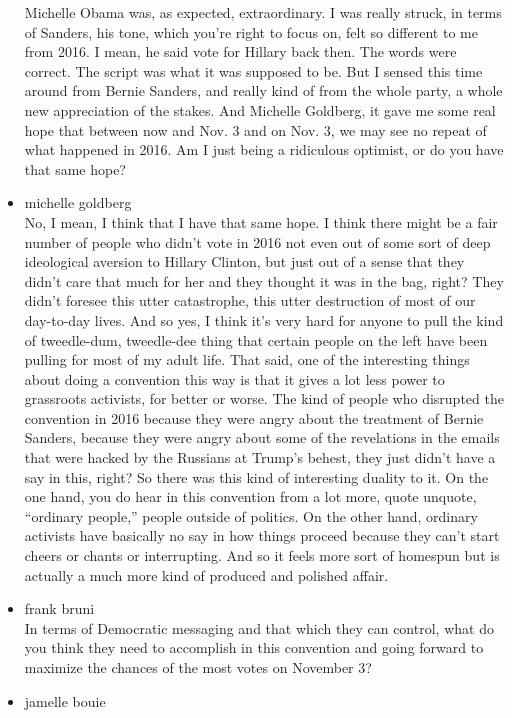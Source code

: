 \begin{itemize}
  Michelle Obama was, as expected, extraordinary. I was really struck,
  in terms of Sanders, his tone, which you're right to focus on, felt so
  different to me from 2016. I mean, he said vote for Hillary back then.
  The words were correct. The script was what it was supposed to be. But
  I sensed this time around from Bernie Sanders, and really kind of from
  the whole party, a whole new appreciation of the stakes. And Michelle
  Goldberg, it gave me some real hope that between now and Nov. 3 and on
  Nov. 3, we may see no repeat of what happened in 2016. Am I just being
  a ridiculous optimist, or do you have that same hope?
\item
  michelle goldberg\\
  No, I mean, I think that I have that same hope. I think there might be
  a fair number of people who didn't vote in 2016 not even out of some
  sort of deep ideological aversion to Hillary Clinton, but just out of
  a sense that they didn't care that much for her and they thought it
  was in the bag, right? They didn't foresee this utter catastrophe,
  this utter destruction of most of our day-to-day lives. And so yes, I
  think it's very hard for anyone to pull the kind of tweedle-dum,
  tweedle-dee thing that certain people on the left have been pulling
  for most of my adult life. That said, one of the interesting things
  about doing a convention this way is that it gives a lot less power to
  grassroots activists, for better or worse. The kind of people who
  disrupted the convention in 2016 because they were angry about the
  treatment of Bernie Sanders, because they were angry about some of the
  revelations in the emails that were hacked by the Russians at Trump's
  behest, they just didn't have a say in this, right? So there was this
  kind of interesting duality to it. On the one hand, you do hear in
  this convention from a lot more, quote unquote, ``ordinary people,''
  people outside of politics. On the other hand, ordinary activists have
  basically no say in how things proceed because they can't start cheers
  or chants or interrupting. And so it feels more sort of homespun but
  is actually a much more kind of produced and polished affair.
\item
  frank bruni\\
  In terms of Democratic messaging and that which they can control, what
  do you think they need to accomplish in this convention and going
  forward to maximize the chances of the most votes on November 3?
\item
  jamelle bouie\\

\end{itemize}
